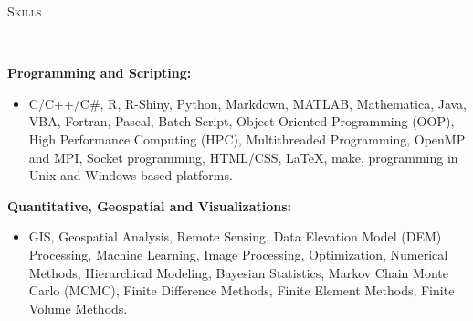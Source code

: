 \documentclass[10pt]{article}
\newenvironment{changemargin}[2]{%
  \begin{list}{}{%
    \setlength{\topsep}{0pt}%
    \setlength{\leftmargin}{#1}%
    \setlength{\rightmargin}{#2}%
    \setlength{\listparindent}{\parindent}%
    \setlength{\itemindent}{\parindent}%
    \setlength{\parsep}{\parskip}%
  }%
  \item[]}{\end{list}
}
\newcommand{\lineover}{
	\begin{changemargin}{-0.05in}{-0.05in}
		\vspace*{-8pt}
		\hrulefill \\
		\vspace*{-2pt}
	\end{changemargin}
}
\newcommand{\header}[1]{
	\begin{changemargin}{-0.5in}{-0.5in}
		\scshape{#1}\\
  	\lineover
	\end{changemargin}
}
\newenvironment{body} {
	\vspace*{-2pt}
	\begin{changemargin}{-0.5in}{-0.5in}
  }
	{\end{changemargin}
}
\begin{document}
\header{Skills}

\begin{body}
	\textbf{Programming and Scripting:} \\
		\vspace*{-4pt}
	\begin{itemize} \itemsep -0pt
	\item[] C/C++/C\#, R, R-Shiny, Python, Markdown, MATLAB, Mathematica, Java, VBA, Fortran, Pascal, Batch Script, Object Oriented Programming (OOP), High Performance Computing (HPC), Multithreaded Programming,  OpenMP and MPI, Socket programming, HTML/CSS, \LaTeX, make, programming in Unix and Windows based platforms.\\
	\end{itemize}

	\textbf{Quantitative, Geospatial and Visualizations:} \\
			\vspace*{-4pt}
\begin{itemize} \itemsep -0pt
\item[] 	GIS, Geospatial Analysis, Remote Sensing, Data Elevation Model (DEM) Processing, Machine Learning, Image Processing, Optimization, Numerical Methods, Hierarchical Modeling, Bayesian Statistics, Markov Chain Monte Carlo (MCMC), Finite Difference Methods, Finite Element Methods, Finite Volume Methods. \\
	\end{itemize}

\end{body}
\end{document}
